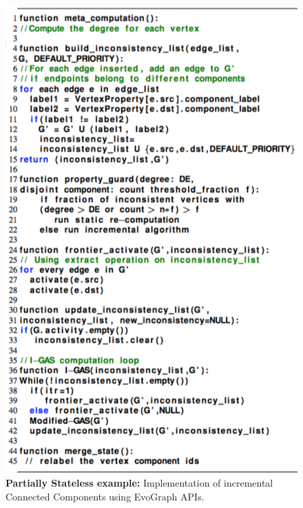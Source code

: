 \begin{figure}[!t]
\centering
\includegraphics [width=\textwidth,height=0.85\textheight,keepaspectratio]{figures/CC-inc.pdf}
\caption{\textbf{Partially Stateless example:} Implementation of incremental Connected Components using EvoGraph APIs. }
\label{fig:CC-inc}
\end{figure}

